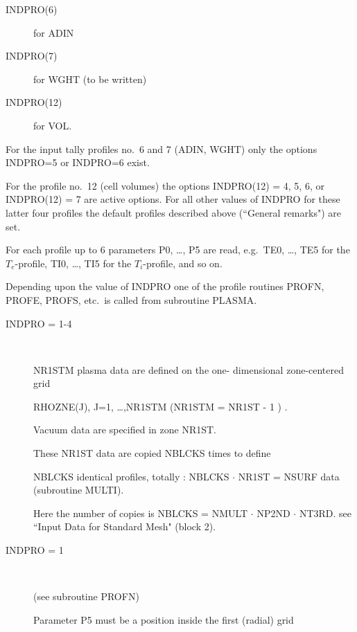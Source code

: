 \begin{description}
\begin{description}
          \item[INDPRO(6)] for ADIN 

          \item[INDPRO(7)] for WGHT (to be written) 

          \item[INDPRO(12)] for VOL.

        \end{description}

        For the input tally profiles no.\ 6 and 7 (ADIN, WGHT) only the options
        INDPRO=5 or INDPRO=6 exist.

        For the profile no.\ 12 (cell volumes) the options INDPRO(12) = 4, 5, 6, or
        INDPRO(12) = 7 are active options.
        For all other values of INDPRO for these latter four profiles the default
        profiles described above (``General remarks") are set.

        For each profile up to 6 parameters P0, \dots, P5 are read, e.g.\ TE0, \dots,
        TE5 for the $T_e $-profile, TI0, \dots, TI5 for the $T_i $-profile, and so on.

        Depending upon the value of INDPRO one of the profile routines PROFN, PROFE,
        PROFS, etc.\ is called from subroutine PLASMA.
        \begin{description}
          \item[INDPRO = 1-4] ~ 

                NR1STM plasma data are defined on the one- dimensional zone-centered grid

                RHOZNE(J), J=1, \ldots,NR1STM	(NR1STM = NR1ST - 1 ) .

                Vacuum data are specified in zone NR1ST.

                These \hfill NR1ST \hfill data \hfill are \hfill copied \hfill NBLCKS \hfill
                times \hfill to \hfill define 

                NBLCKS identical profiles, totally : NBLCKS $\cdot$ NR1ST = NSURF data
                (subroutine MULTI).

                Here the number of copies is NBLCKS = NMULT $\cdot$ NP2ND $\cdot$ NT3RD.
                see ``Input Data for Standard Mesh" (block 2).
          \item[INDPRO = 1] ~ 

                (see subroutine PROFN) 

                Parameter P5 must be a position inside the first (radial) grid


\end{description}
\end{description}
